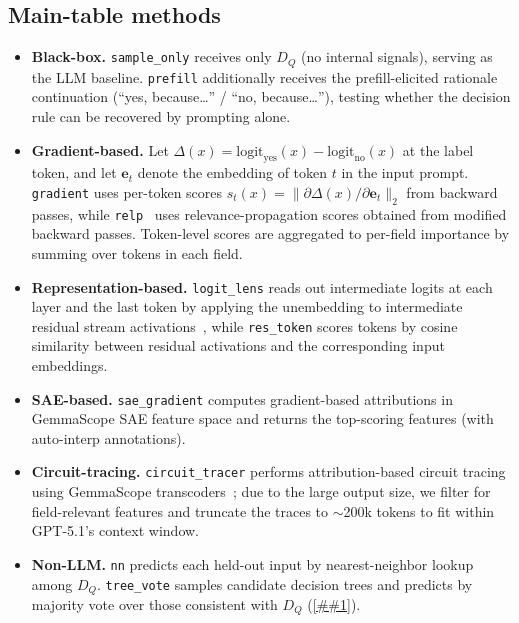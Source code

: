 \documentclass{article} %
\newcommand{\Cref}[1]{\ref{##1}}
\begin{document}
\subsection{Main-table methods}
\begin{itemize}[nosep,leftmargin=*]
    \item \textbf{Black-box.} \texttt{sample\_only} receives only $D_Q$ (no internal signals), serving as the LLM baseline. \texttt{prefill} additionally receives the prefill-elicited rationale continuation (``yes, because\ldots'' / ``no, because\ldots''), testing whether the decision rule can be recovered by prompting alone.
    \item \textbf{Gradient-based.} Let $\Delta(x)=\text{logit}_\text{yes}(x)-\text{logit}_\text{no}(x)$ at the label token, and let $\mathbf{e}_t$ denote the embedding of token $t$ in the input prompt. \texttt{gradient} uses per-token scores $s_t(x)=\|\partial \Delta(x)/\partial \mathbf{e}_t\|_2$ from backward passes, while \texttt{relp}~\citep{relp2025} uses relevance-propagation scores obtained from modified backward passes. Token-level scores are aggregated to per-field importance by summing over tokens in each field.
    \item \textbf{Representation-based.} \texttt{logit\_lens} reads out intermediate logits at each layer and the last token by applying the unembedding to intermediate residual stream activations~\citep{nostalgebraist2020logitlens}, while \texttt{res\_token} scores tokens by cosine similarity between residual activations and the corresponding input embeddings.
    \item \textbf{SAE-based.} \texttt{sae\_gradient} computes gradient-based attributions in GemmaScope SAE feature space and returns the top-scoring features (with auto-interp annotations).
    \item \textbf{Circuit-tracing.} \texttt{circuit\_tracer} performs attribution-based circuit tracing \citep{ameisen2025circuit} using GemmaScope transcoders~\citep{gemmascope2024}; due to the large output size, we filter for field-relevant features and truncate the traces to ${\sim}$200k tokens to fit within GPT-5.1's context window.
    \item \textbf{Non-LLM.} \texttt{nn} predicts each held-out input by nearest-neighbor lookup among $D_Q$. \texttt{tree\_vote} samples candidate decision trees and predicts by majority vote over those consistent with $D_Q$ (\Cref{app:tree_voting}).
\end{itemize}
\end{document}
